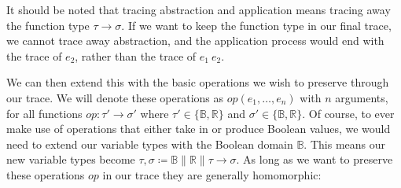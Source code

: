         \begin{prooftree}
        \end{prooftree}

        \begin{prooftree}
        \end{prooftree}

        It should be noted that tracing abstraction and application means tracing away the function type $\tau\to\sigma$.
        If we want to keep the function type in our final trace, we cannot trace away abstraction, and the application process would end with the trace of $e_2$, rather than the trace of $e_1\ e_2$.

        We can then extend this with the basic operations we wish to preserve through our trace.
        We will denote these operations as $op(e_1,\dots,e_n)$ with $n$ arguments, for all functions $op:\tau'\to\sigma'$ where $\tau'\in\{\mathbb{B},\mathbb{R}\}$ and $\sigma'\in\{\mathbb{B},\mathbb{R}\}$.
        Of course, to ever make use of operations that either take in or produce Boolean values, we would need to extend our variable types with the Boolean domain $\mathbb{B}$.
        This means our new variable types become $\tau,\sigma\coloneqq\mathbb{B}\|\mathbb{R}\|\tau\to\sigma$.
        As long as we want to preserve these operations $op$ in our trace they are generally homomorphic:

        \begin{prooftree}
        \end{prooftree}

        \begin{prooftree}
        \end{prooftree}

